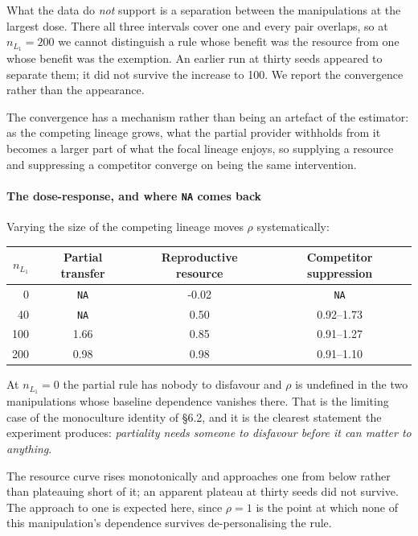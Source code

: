 \documentclass[review,3p,times]{elsarticle}
\begin{document}
What the data do \emph{not} support is a separation between the
manipulations at the largest dose. There all three intervals cover one and every pair overlaps, so at
$n_{L_1}=200$ we cannot distinguish a rule whose benefit
was the resource from one whose benefit was the exemption. An
earlier run at thirty seeds appeared to separate them; it did not
survive the increase to 100. We report the
convergence rather than the appearance.

The convergence has a mechanism rather than being an artefact of the
estimator: as the competing lineage grows, what the partial provider
withholds from it becomes a larger part of what the focal lineage
enjoys, so supplying a resource and suppressing a competitor converge
on being the same intervention.

\paragraph{The dose-response, and where \texorpdfstring{\texttt{NA}}{NA} comes back}
Varying the size of the competing lineage moves $\rho$ systematically:
\begin{center}\small
\begin{tabular}{rccc}
\toprule
$n_{L_1}$ & Partial transfer & Reproductive resource & Competitor suppression\\
\midrule
0 & \texttt{NA} & -0.02 & \texttt{NA}\\
40 & \texttt{NA} & 0.50 & 0.92--1.73\\
100 & 1.66 & 0.85 & 0.91--1.27\\
200 & 0.98 & 0.98 & 0.91--1.10\\
\bottomrule
\end{tabular}
\end{center}

At $n_{L_1}=0$ the partial rule has nobody to disfavour and $\rho$ is
undefined in the two manipulations whose baseline dependence vanishes
there. That is the limiting case of the monoculture identity of \S6.2,
and it is the clearest statement the experiment produces:
\emph{partiality needs someone to disfavour before it can matter to
anything}.

The resource curve rises monotonically and approaches one from below rather than
plateauing short of it; an apparent plateau at thirty seeds did not
survive. The approach to one is expected here, since $\rho=1$ is the
point at which none of this manipulation's dependence survives
de-personalising the rule.
\end{document}
